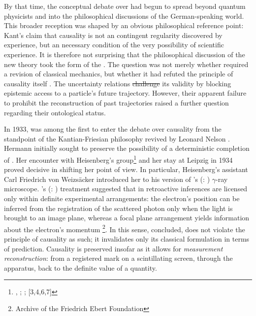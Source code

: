 \documentclass[pdflatex]{sn-jnl}
\renewcommand{\citets}[2][]{\citeauthor{#2}'s (\citeyear{#2}\if\relax\detokenize{#1}\relax\else: #1\fi)}
\newcommand{\vW}{von Weizsäcker\xspace}
\providecommand{\DIFadd}[1]{{\protect\color{blue}\uwave{#1}}} %
\providecommand{\DIFdel}[1]{{\protect\color{red}\sout{#1}}}                      %
\providecommand{\DIFaddbegin}{} %
\providecommand{\DIFaddend}{} %
\providecommand{\DIFdelbegin}{} %
\providecommand{\DIFdelend}{} %
\begin{document}
By that time, the conceptual debate over \qm had begun to spread beyond quantum physicists and into the philosophical discussions of the German-speaking world. This broader reception was shaped by an obvious philosophical reference point: Kant's claim that causality is not an \apo contingent regularity discovered by experience, but an \apr necessary condition of the very possibility of scientific experience. It is therefore not surprising that the philosophical discussion of the new theory took the form of the  \citep[2.VI.1]{Mehra2001a}. The question was not merely whether \qm required a revision of classical mechanics, but whether it had refuted the principle of causality itself \citep{Bergmann1929,Frank1932}. The uncertainty relations \DIFdelbegin \DIFdel{challenge }\DIFdelend \DIFaddbegin \DIFadd{challenged }\DIFaddend its validity by blocking epistemic access to a particle's future trajectory. However, their apparent failure to prohibit the reconstruction of past trajectories raised a further question regarding their ontological status.

In 1933, \citet{Hermann1933} was among the first to enter the debate over causality from the standpoint of the Kantian-Friesian philosophy revived by Leonard Nelson \citep{Soler2017}. Hermann initially sought to preserve the possibility of a deterministic completion of \qm. Her encounter with Heisenberg's group\footnote{, ; ; \DIFdelbegin %
\DIFdelend \DIFaddbegin {}[3,4,6,7]\DIFaddend } and her stay at Leipzig in 1934 proved decisive in shifting her point of view. In particular, Heisenberg's assistant Carl Friedrich \vW introduced her to his version of \citets{Heisenberg1927} $\gamma$-ray microscope. \citets{Weizsacker1931} treatment suggested that in \qm retroactive inferences are licensed only within definite experimental arrangements: the electron's position can be inferred from the registration of the scattered photon only when the light is brought to an image plane, whereas a focal plane arrangement yields information about the electron's momentum \footnote{Archive of the Friedrich Ebert Foundation}. In this sense, \citet{Hermann1935} concluded, \qm does not violate the principle of causality as such; it invalidates only its classical formulation in terms of prediction. Causality is preserved insofar as it allows for \emph{measurement reconstruction}: from a registered mark on a scintillating screen, through the apparatus, back to the definite value of a quantity.
\end{document}
